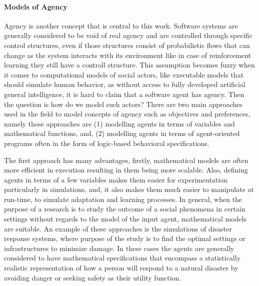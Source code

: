 \paragraph{Models of Agency}
Agency is another concept that is central to this work. Software systems are generally considered to be void of real agency and are controlled through specific control structures, even if those structures consist of probabilistic flows that can change as the system interacts with its environment like in case of reinforcement learning they still have a controll structure. This assumption becomes fuzzy when it comes to computational models of social actors, like executable models that should simulate human behavior, as without access to fully developed artificial general intelligence, it is hard to claim that a software agent has agency. Then the question is how do we model such actors? There are two main approaches used in the field to model concepts of agency such as objectives and preferences, namely these approaches are (1) modelling agents in terms of variables and mathematical functions, and, (2) modelling agents in terms of agent-oriented programs often in the form of logic-based behavioral specifications. 


The first approach has many advantages, firstly, mathematical models are often more efficient in execution resulting in them being more scalable. Also, defining agents in terms of a few variables makes them easier for experimentation particularly in simulations, and, it also makes them much easier to manipulate at run-time, to simulate adaptation and learning processes. In general, when the purpose of a research is to study the outcome of a social phenomena in certain settings without regards to the model of the input agent, mathematical models are suitable. An example of these approaches is the simulations of disaster response systems, where purpose of the study is to find the optimal settings or infrastructures to minimize damage. In these cases the agents are generally considered to have mathematical specifications that encompass a statistically realistic representation of how a person will respond to a natural disaster by avoiding danger or seeking safety as their utility function\cite{Something}.


